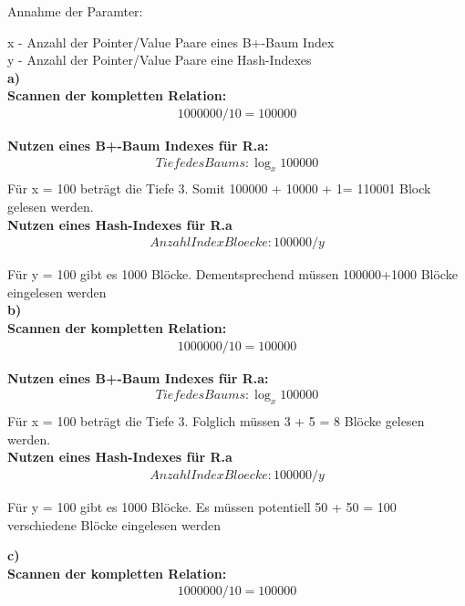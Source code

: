 \documentclass[12pt]{article}
\begin{document}
\noindent Annahme der Paramter:

x	-	Anzahl der Pointer/Value Paare eines B+-Baum Index \\
\indent y 	-	Anzahl der Pointer/Value Paare eine Hash-Indexes \\


\noindent \textbf{a)} \\
\textbf{Scannen der kompletten Relation:}
\begin{align*}
	1000000 / 10 = 100000 
\end{align*}

\noindent \textbf{Nutzen eines B+-Baum Indexes für R.a:}
\begin{align*}
	Tiefe des Baums:  \log_{x}100000 \\
\end{align*}
Für x = 100 beträgt die Tiefe 3. Somit 100000 + 10000 + 1= 110001 Block gelesen werden. \\


\noindent \textbf{Nutzen eines Hash-Indexes für R.a}
\begin{align*}
	Anzahl Index Bloecke: 100000 / y   
\end{align*}

\noindent
Für y = 100 gibt es 1000 Blöcke.
Dementsprechend müssen 100000+1000 Blöcke eingelesen werden\\

\noindent \textbf{b)} \\
\textbf{Scannen der kompletten Relation:}
\begin{align*}
	1000000 / 10 = 100000 
\end{align*}

\noindent \textbf{Nutzen eines B+-Baum Indexes für R.a:}
\begin{align*}
	Tiefe des Baums:  \log_{x}100000 \\
\end{align*}
Für x = 100 beträgt die Tiefe 3. Folglich müssen 3 + 5  =  8 Blöcke gelesen werden.\\


\noindent \textbf{Nutzen eines Hash-Indexes für R.a}
\begin{align*}
	Anzahl Index Bloecke: 100000 / y   
\end{align*}

\noindent
Für y = 100 gibt es 1000 Blöcke. Es müssen potentiell 50 + 50 = 100 verschiedene Blöcke eingelesen werden

\newpage
\noindent \textbf{c)} \\
\textbf{Scannen der kompletten Relation:}
\begin{align*}
	1000000 / 10 = 100000 
\end{align*}
\end{document}
